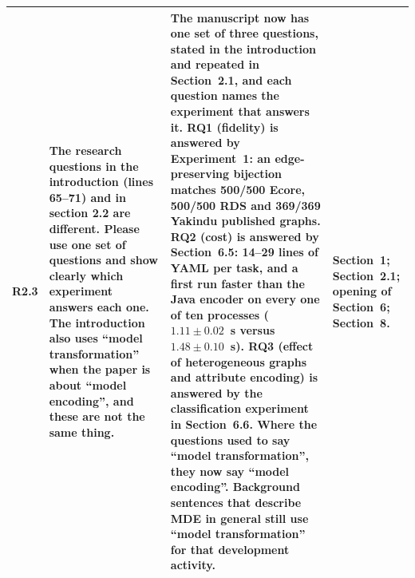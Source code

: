 \documentclass[11pt,a4paper]{article}
\begin{document}
\begin{longtable}{@{}P{1.0cm}P{4.3cm}P{5.9cm}P{3.9cm}@{}}
R2.3 &
The research questions in the introduction (lines 65--71) and in section 2.2 are different. Please use one set of questions and show clearly which experiment answers each one. The introduction also uses ``model transformation'' when the paper is about ``model encoding'', and these are not the same thing. &
The manuscript now has one set of three questions, stated in the introduction and repeated in Section~2.1, and each question names the experiment that answers it. RQ1 (fidelity) is answered by Experiment~1: an edge-preserving bijection matches 500/500 Ecore, 500/500 RDS and 369/369 Yakindu published graphs. RQ2 (cost) is answered by Section~6.5: 14--29 lines of YAML per task, and a first run faster than the Java encoder on every one of ten processes ($1.11\pm0.02$~s versus $1.48\pm0.10$~s). RQ3 (effect of heterogeneous graphs and attribute encoding) is answered by the classification experiment in Section~6.6. Where the questions used to say ``model transformation'', they now say ``model encoding''. Background sentences that describe MDE in general still use ``model transformation'' for that development activity. &
Section~1; Section~2.1; opening of Section~6; Section~8. \\
\midrule


\end{longtable}
\end{document}
